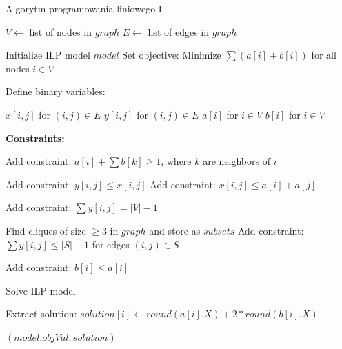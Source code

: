 \begin{algorithm}
    \caption*{Algorytm programowania liniowego I}
    \begin{algorithmic}[1]
            \State $V \gets$ list of nodes in $graph$
            \State $E \gets$ list of edges in $graph$
    
            \State Initialize ILP model $model$
            \State Set objective: Minimize $\sum (a[i] + b[i])$ for all nodes $i \in V$
    
            \State Define binary variables:

            \State $x[i, j]$ for $(i, j) \in E$ 
            \State $y[i, j]$ for $(i, j) \in E$ 
            \State $a[i]$ for $i \in V$ 
            \State $b[i]$ for $i \in V$ 
    
            \State \textbf{Constraints:}
    
             
                \State Add constraint: $a[i] + \sum b[k] \geq 1$, where $k$ are neighbors of $i$
            \EndFor
    
                \State Add constraint: $y[i, j] \leq x[i, j]$ 
                \State Add constraint: $x[i, j] \leq a[i] + a[j]$ 
            \EndFor
    
            \State Add constraint: $\sum y[i, j] = |V| - 1$ 
    
            \State Find cliques of size $\geq 3$ in $graph$ and store as $subsets$
             
                \State Add constraint: $\sum y[i, j] \leq |S| - 1$ for edges $(i, j) \in S$
            \EndFor
    
             
                \State Add constraint: $b[i] \leq a[i]$
            \EndFor
    
            \State Solve ILP model
    
            \State Extract solution:
                \State $solution[i] \gets round(a[i].X) + 2 * round(b[i].X)$
            \EndFor
    
            \State \Return $(model.objVal, solution)$
        \EndFunction
    \end{algorithmic}
\end{algorithm}

